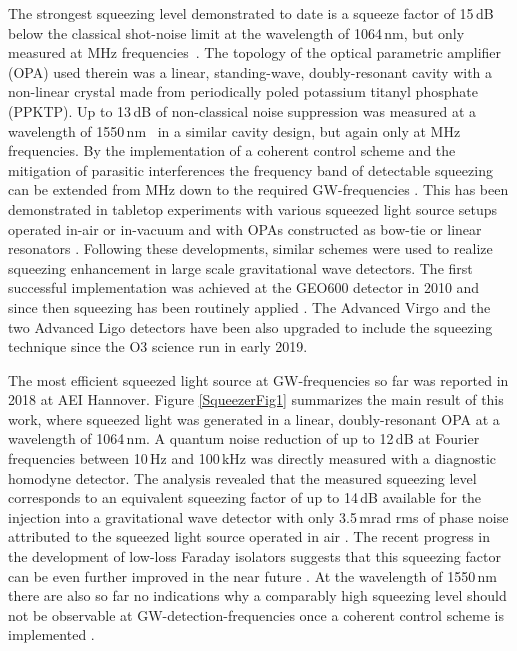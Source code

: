 %
The strongest squeezing level demonstrated to date is a squeeze factor of 15\,dB below the classical shot-noise limit at the wavelength of 1064\,nm, but only measured at MHz frequencies~\cite{Vahlbruch2016}. The topology of the optical parametric amplifier (OPA) used therein was a linear, standing-wave, doubly-resonant cavity with a non-linear crystal made from periodically poled potassium titanyl phosphate (PPKTP).  
%
Up to 13\,dB of non-classical noise suppression was measured at a wavelength of 1550\,nm~\cite{Schonbeck18} in a similar cavity design, but again only at MHz frequencies. 
%
By the implementation of a coherent control scheme \cite{Vahlbruch2006} and the mitigation of parasitic interferences the frequency band of detectable squeezing can be extended from MHz down to the required GW-frequencies \cite{Vahlbruch2007}. 
This has been demonstrated in tabletop experiments with various squeezed light source setups operated in-air or in-vacuum and with OPAs constructed as bow-tie or linear resonators \cite{Vahlbruch2006,Stefszky2012, Wade2016}.
%
Following these developments, similar schemes were used to realize squeezing enhancement in large scale gravitational wave detectors. 
The first successful implementation was achieved at the GEO600 detector in 2010 and since then squeezing has been routinely applied \cite{2011_Nat.Phys.7.962_LSC, Grote2013}. 
The Advanced Virgo and the two Advanced Ligo detectors have been also upgraded to include the squeezing technique since the O3 science run in early 2019.  
%

The most efficient  squeezed light source at GW-frequencies so far was reported in 2018 \cite{Mehmet2018} at AEI Hannover. Figure \ref{SqueezerFig1} summarizes the main result of this work, where squeezed light was generated in a linear, doubly-resonant OPA at a wavelength of 1064\,nm. A quantum noise reduction of up to 12\,dB at Fourier frequencies between 10\,Hz and 100\,kHz was directly measured with a diagnostic homodyne detector. The analysis revealed that the measured squeezing level corresponds to an equivalent squeezing factor of up to 14\,dB available for the injection into a gravitational wave detector with only 3.5\,mrad rms of phase noise attributed to the squeezed light source operated in air . The recent progress in the development of low-loss Faraday isolators suggests that this squeezing factor can be even further improved in the near future . 
At the wavelength of 1550\,nm there are also so far no indications why a comparably high squeezing level should not be observable  at GW-detection-frequencies once a coherent control scheme is implemented \cite{Mehmet2011} . 

